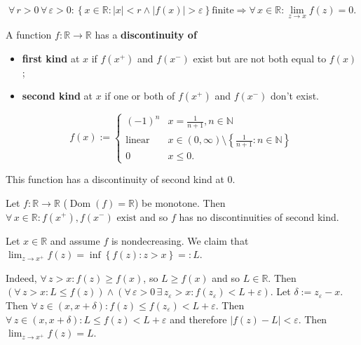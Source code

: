 \documentclass{notes}
\begin{document}
  \begin{lem}
    \[
      \forall \, r > 0 \, \forall \, \varepsilon > 0: \left \{ x \in \mathbb R : \left | x \right | < r \land \left | f(x) \right | > \varepsilon \right \} \text{finite} \Rightarrow \forall \, x \in \mathbb R: \lim_{z \to x} f(z) = 0.
    \]
  \end{lem}
  
  \begin{defn}
    A function $f \colon \mathbb R \to \mathbb R$ has a {\boldmath \bfseries discontinuity of }
    \begin{itemize}
      \item {\boldmath \bfseries first kind} at $x$ if $f(x^+)$ and $f(x^-)$ exist but are not both equal to $f(x)$;

      \item {\boldmath \bfseries second kind} at $x$ if one or both of $f(x^+)$ and $f(x^-)$ don't exist.
    \end{itemize}
  \end{defn}
  
  \newpage
  
  \begin{eg}
    \begin{equation}
      f(x) := \begin{cases}
        (-1)^n & x = \frac{1}{n + 1}, n \in \mathbb N \\ 
        \text{linear} & x \in (0, \infty) \setminus \left \{ \frac{1}{n + 1} : n \in \mathbb N \right \} \\ 
        0 & x \leq 0.
      \end{cases}
    \end{equation}
    
    
    This function has a discontinuity of second kind at 0.
  \end{eg}

  \begin{lem}
    Let $f \colon \mathbb R \to \mathbb R$ ($\operatorname{Dom}(f) = \mathbb R$) be monotone.
    Then $\forall \, x \in \mathbb R: \text{$f(x^+), f(x^-)$ exist}$ and so $f$ has no discontinuities of second kind.
  \end{lem}
  
  \begin{prf}
    Let $x \in \mathbb R$ and assume $f$ is nondecreasing.
    We claim that $\lim_{z \to x^+} f(z) = \inf \left \{ f(z) : z > x \right \}=: L$.

    Indeed, $\forall \, z > x: f(z) \geq f(x)$, so $L \geq f(x)$ and so $L \in \mathbb R$.
    Then $(\forall \, z > x: L \leq f(z)) \land (\forall \, \varepsilon > 0 \, \exists \, z_\varepsilon  > x: f(z_\varepsilon) < L + \varepsilon)$.
    Let $\delta := z_\varepsilon - x$.
    Then $\forall \, z \in (x, x + \delta): f(z) \leq f(z_\varepsilon) < L + \varepsilon$.
    Then $\forall \, z \in (x, x + \delta): L \leq f(z) < L + \varepsilon$ and therefore $\left | f(z) - L \right | < \varepsilon$.
    Then $\lim_{z \to x^+} f(z) = L$.
  \end{prf}
  
\end{document}
